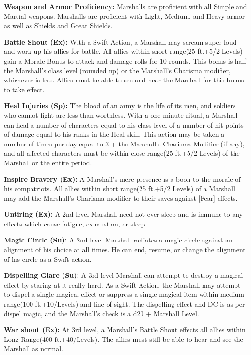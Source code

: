 \classfeatures

\textbf{Weapon and Armor Proficiency:} Marshalls are proficient with all Simple and Martial weapons. Marshalls are proficient with Light, Medium, and Heavy armor as well as Shields and Great Shields.

\textbf{Battle Shout (Ex):} With a Swift Action, a Marshall may scream super loud and work up his allies for battle. All allies within short range(25 ft.+5/2 Levels) gain a Morale Bonus to attack and damage rolls for 10 rounds. This bonus is half the Marshall's class level (rounded up) or the Marshall's Charisma modifier, whichever is less. Allies must be able to see and hear the Marshall for this bonus to take effect.

\textbf{Heal Injuries (Sp):} The blood of an army is the life of its men, and soldiers who cannot fight are less than worthless. With a one minute ritual, a Marshall can heal a number of characters equal to his class level of a number of hit points of damage equal to his ranks in the Heal skill. This action may be taken a number of times per day equal to 3 + the Marshall's Charisma Modifier (if any), and all affected characters must be within close range(25 ft.+5/2 Levels) of the Marshall or the entire period.

\textbf{Inspire Bravery (Ex):} A Marshall's mere presence is a boon to the morale of his compatriots. All allies within short range(25 ft.+5/2 Levels) of a Marshall may add the Marshall's Charisma modifier to their saves against [Fear] effects.

\textbf{Untiring (Ex):} A 2nd level Marshall need not ever sleep and is immune to any effects which cause fatigue, exhaustion, or sleep.

\textbf{Magic Circle (Su):} A 2nd level Marshall radiates a magic circle against an alignment of his choice at all times. He can end, resume, or change the alignment of his circle as a Swift action.

\textbf{Dispelling Glare (Su):} A 3rd level Marshall can attempt to destroy a magical effect by staring at it really hard. As a Swift Action, the Marshall may attempt to dispel a single magical effect or suppress a single magical item within medium range(100 ft.+10/Levels) and line of sight. The dispelling effect and DC is as per dispel magic, and the Marshall's check is a d20 + Marshall Level.

\textbf{War shout (Ex):} At 3rd level, a Marshall's Battle Shout effects all allies within Long Range(400 ft.+40/Levels). The allies must still be able to hear and see the Marshall as normal.

